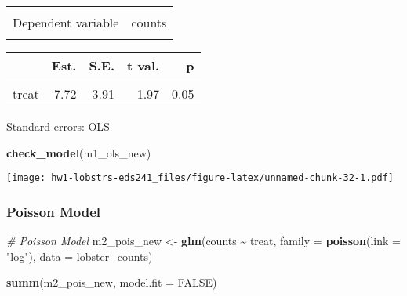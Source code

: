 \documentclass[
]{article}
\newenvironment{Shaded}{\begin{snugshade}}{\end{snugshade}}
\newcommand{\AttributeTok}[1]{\textcolor[rgb]{0.13,0.29,0.53}{#1}}
\newcommand{\CommentTok}[1]{\textcolor[rgb]{0.56,0.35,0.01}{\textit{#1}}}
\newcommand{\ConstantTok}[1]{\textcolor[rgb]{0.56,0.35,0.01}{#1}}
\newcommand{\FunctionTok}[1]{\textcolor[rgb]{0.13,0.29,0.53}{\textbf{#1}}}
\newcommand{\NormalTok}[1]{#1}
\newcommand{\OtherTok}[1]{\textcolor[rgb]{0.56,0.35,0.01}{#1}}
\newcommand{\SpecialCharTok}[1]{\textcolor[rgb]{0.81,0.36,0.00}{\textbf{#1}}}
\newcommand{\StringTok}[1]{\textcolor[rgb]{0.31,0.60,0.02}{#1}}
\begin{document}
\begin{table}[!h]
\centering
\begin{tabular}{lr}
\toprule
\cellcolor{gray!10}{Observations} & \cellcolor{gray!10}{466}\\
Dependent variable & counts\\
\cellcolor{gray!10}{Type} & \cellcolor{gray!10}{OLS linear regression}\\
\bottomrule
\end{tabular}
\end{table}  \begin{table}[!h]
\centering
\begin{threeparttable}
\begin{tabular}{lrrrr}
\toprule
  & Est. & S.E. & t val. & p\\
\midrule
\cellcolor{gray!10}{(Intercept)} & \cellcolor{gray!10}{27.27} & \cellcolor{gray!10}{2.69} & \cellcolor{gray!10}{10.15} & \cellcolor{gray!10}{0.00}\\
treat & 7.72 & 3.91 & 1.97 & 0.05\\
\bottomrule
\end{tabular}
\begin{tablenotes}
\item Standard errors: OLS
\end{tablenotes}
\end{threeparttable}
\end{table}

\begin{Shaded}
\begin{Highlighting}[]
\FunctionTok{check\_model}\NormalTok{(m1\_ols\_new)}
\end{Highlighting}
\end{Shaded}

\texttt{[image: hw1-lobstrs-eds241\_files/figure-latex/unnamed-chunk-32-1.pdf]}

\hypertarget{poisson-model}{%
\subsubsection{Poisson Model}\label{poisson-model}}

\begin{Shaded}
\begin{Highlighting}[]
\CommentTok{\# Poisson Model}
\NormalTok{m2\_pois\_new }\OtherTok{\textless{}{-}} \FunctionTok{glm}\NormalTok{(counts }\SpecialCharTok{\textasciitilde{}}\NormalTok{ treat,}
               \AttributeTok{family =} \FunctionTok{poisson}\NormalTok{(}\AttributeTok{link =} \StringTok{"log"}\NormalTok{),}
               \AttributeTok{data =}\NormalTok{ lobster\_counts)}

\FunctionTok{summ}\NormalTok{(m2\_pois\_new, }\AttributeTok{model.fit =} \ConstantTok{FALSE}\NormalTok{)}
\end{Highlighting}
\end{Shaded}
\end{document}
